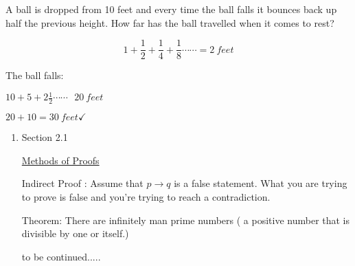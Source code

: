 \documentclass[10pt,letterpaper]{article}
\begin{document}
{\begin{enumerate}
    A ball is dropped from 10 feet and every time the ball falls it bounces back up half the previous height. How far has the ball travelled when it comes to rest?
    
    $$ 1 + \frac{1}{2} + \frac{1}{4} + \frac{1}{8} \cdots \cdots = 2 \ feet $$
    
    The ball falls: 
    
    $10 + 5 + 2\frac{1}{2} \cdots  \cdots \ \ \ 20 \ feet$
    
    $20 + 10 = 30 \ feet \checkmark$
    
\end{enumerate}

\newpage{}
\begin{enumerate}
    \item[]
    Section 2.1
    \begin{center}
                \underline{Methods of Proofs} \vspace{.5em}
    \end{center}
    
    Indirect Proof : Assume that $p \rightarrow q$ is a false statement. What you are trying to prove is false and you're trying to reach a contradiction.
    
    \vspace{1em}
    Theorem: There are infinitely man prime numbers ( a positive number that is divisible by one or itself.)
    
        \vspace{5em}
    to be continued.....
    $$ $$
  
\end{enumerate}



}
\end{document}
